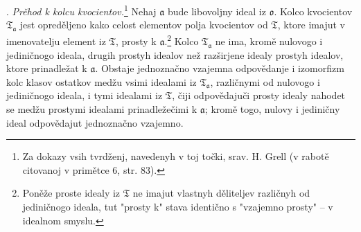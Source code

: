 \documentclass[11pt]{article}
\newcommand{\mo}{\mathfrak{o}}
\newcommand{\mT}{\mathfrak{T}}
\newcommand{\ma}{\mathfrak{a}}
\begin{document}
\setcounter{footnote}{35}

. \emph{Prěhod k kolcu kvocientov.}\footnote{Za dokazy vsih tvrdženj, navedenyh v toj točki, srav. H. Grell (v rabotě citovanoj v primětce 6, str. 83).} Nehaj $\ma$ bude libovoljny ideal iz $\mo$. Kolco kvocientov $\mT_\ma$ jest opreděljeno kako celost elementov polja kvocientov od $\mT$, ktore imajut v imenovatelju element iz $\mT$, prosty k $\ma$.\footnote{Poněže proste idealy iz $\mT$ ne imajut vlastnyh děliteljev različnyh od jediničnogo ideala, tut "prosty k" stava identično s "vzajemno prosty" -- v idealnom smyslu.} Kolco $\mT_\ma$ ne ima, kromě nulovogo i jediničnogo ideala, drugih prostyh idealov než razširjene idealy prostyh idealov, ktore prinadležat k $\ma$. Obstaje jednoznačno vzajemna odpovědanje i izomorfizm kolc klasov ostatkov medžu vsimi idealami iz $\mT_\ma$, različnymi od nulovogo i jediničnogo ideala, i tymi idealami iz $\mT$, čiji odpovědajuči prosty idealy nahodet se medžu prostymi idealami prinadležečimi k $\ma$; kromě togo, nulovy i jediničny ideal odpovědajut jednoznačno vzajemno.
\end{document}
